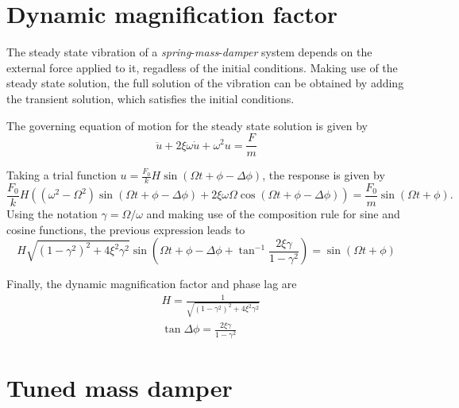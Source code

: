 \documentclass{article}
\begin{document}
\section*{Dynamic magnification factor}

The steady state vibration of a \emph{spring}-\emph{mass}-\emph{damper} system depends on the external force applied to it, regadless of the initial conditions. Making use of the steady state solution, the full solution of the vibration can be obtained by adding the transient solution, which satisfies the initial conditions.

\begin{center}
\end{center}

The governing equation of motion for the steady state solution is given by
$$
\ddot{u} + 2\xi\omega\dot{u} + \omega^2u = \frac{F}{m}
$$

Taking a trial function $u=\frac{F_0}{k}H\sin(\Omega t + \phi - \Delta\phi)$, the response is given by
$$
\frac{F_0}{k}H\left(
    (\omega^2-\Omega^2)\sin(\Omega t + \phi - \Delta\phi) + 2\xi\omega\Omega\cos(\Omega t + \phi - \Delta\phi)
\right) = \frac{F_0}{m} \sin(\Omega t + \phi).
$$
Using the notation $\gamma=\Omega/\omega$ and making use of the composition rule for sine and cosine functions, the previous expression leads to
$$
H\sqrt{(1-\gamma^2)^2 + 4\xi^2\gamma^2} \sin\left(\Omega t + \phi -\Delta\phi + \tan^{-1}\frac{2\xi\gamma}{1-\gamma^2}\right) =
    \sin(\Omega t + \phi)
$$

Finally, the dynamic magnification factor and phase lag are
\begin{align*}
    &H = \frac{1}{\sqrt{(1-\gamma^2)^2 + 4\xi^2\gamma^2}} \\
    &\tan\Delta\phi = \frac{2\xi\gamma}{1-\gamma^2}
\end{align*}


\section*{Tuned mass damper}
\end{document}
